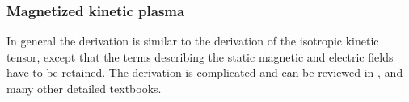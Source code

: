 \documentclass[a4paper,11pt]{thesis}
\begin{document}






\subsubsection{Magnetized kinetic plasma}
In general the derivation is similar to the derivation of the isotropic kinetic tensor, except that the terms describing the static magnetic and electric fields have to be retained. The derivation is complicated and can be reviewed in \cite{swanson}, \cite{brambilla} and many other detailed textbooks.\\








\end{document}
